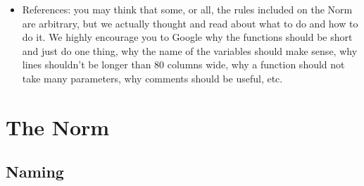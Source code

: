 \documentclass{42-en}
\begin{document}
\begin{itemize}
    \item References: you may think that some, or all, the rules included on the Norm are
      arbitrary, but we actually thought and read about what to do and how to do it. We highly
      encourage you to Google why the functions should be short and just do one thing, why the
      name of the variables should make sense, why lines shouldn't be longer than 80 columns wide,
      why a function should not take many parameters, why comments should be useful, etc.

    \end{itemize}


\newpage

\chapter{The Norm}


    \section{Naming}
\end{document}
